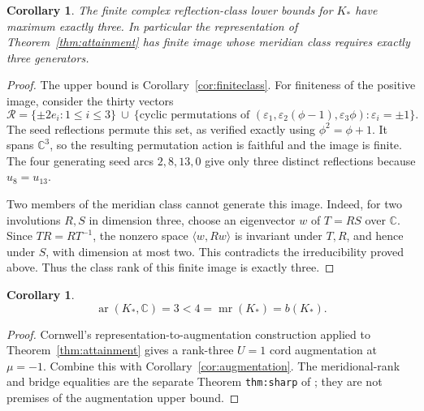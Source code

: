 \documentclass[11pt]{article}
\newtheorem{corollary}[theorem]{Corollary}
\newcommand{\mr}{\operatorname{mr}}
\newcommand{\ar}{\operatorname{ar}}
\newcommand{\C}{\mathbb C}
\begin{document}
\begin{corollary}\label{cor:finiteattainment}
The finite complex reflection-class lower bounds for $K_*$
have maximum exactly three. In particular the representation
of Theorem~\ref{thm:attainment} has finite image whose meridian
class requires exactly three generators.
\end{corollary}
\begin{proof}
The upper bound is Corollary~\ref{cor:finiteclass}.
For finiteness of the positive image, consider the thirty vectors
\[
 \mathcal R=\{\pm2e_i:1\le i\le3\}
 \ \cup\
 \{\text{cyclic permutations of }
     (\varepsilon_1,\varepsilon_2(\phi-1),\varepsilon_3\phi):
       \varepsilon_i=\pm1\}.
\]
The seed reflections permute this set, as verified exactly
using $\phi^2=\phi+1$. It spans $\C^3$, so the resulting
permutation action is faithful and the image is finite.
The four generating seed arcs $2,8,13,0$ give only three
distinct reflections because $u_8=u_{13}$.

Two members of the meridian class cannot generate this image.
Indeed, for two involutions $R,S$ in dimension three, choose an
eigenvector $w$ of $T=RS$ over $\C$.
Since $TR=RT^{-1}$, the nonzero space
$\langle w,Rw\rangle$ is invariant under $T,R$, and hence under
$S$, with dimension at most two. This contradicts the
irreducibility proved above. Thus the class rank of this finite
image is exactly three.
\end{proof}

\begin{corollary}\label{cor:gap}
\[
 \ar(K_*,\C)=3<4=\mr(K_*)=b(K_*).
\]
\end{corollary}
\begin{proof}
Cornwell's representation-to-augmentation construction
\cite[Proposition~2.12 and Definition~1.8]{cornwell}
applied to Theorem~\ref{thm:attainment} gives a rank-three
$U=1$ cord augmentation at $\mu=-1$.
Combine this with Corollary~\ref{cor:augmentation}.
The meridional-rank and bridge equalities are the separate
Theorem \texttt{thm:sharp} of \cite{new17};
they are not premises of the augmentation upper bound.
\end{proof}
\end{document}
